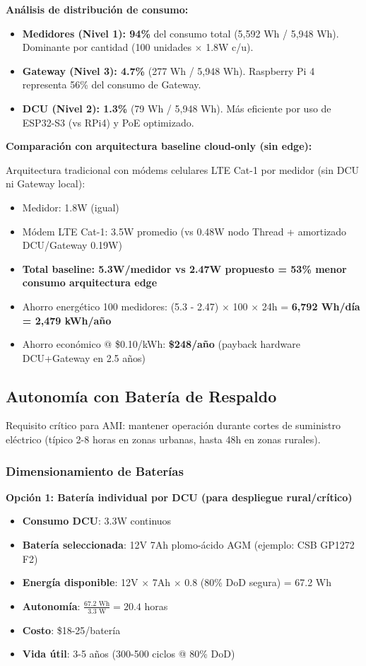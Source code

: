 \textbf{Análisis de distribución de consumo:}

\begin{itemize}
    \item \textbf{Medidores (Nivel 1): 94\%} del consumo total (5,592 Wh / 5,948 Wh). Dominante por cantidad (100 unidades $\times$ 1.8W c/u).
    \item \textbf{Gateway (Nivel 3): 4.7\%} (277 Wh / 5,948 Wh). Raspberry Pi 4 representa 56\% del consumo de Gateway.
    \item \textbf{DCU (Nivel 2): 1.3\%} (79 Wh / 5,948 Wh). Más eficiente por uso de ESP32-S3 (vs RPi4) y PoE optimizado.
\end{itemize}

\textbf{Comparación con arquitectura baseline cloud-only (sin edge):}

Arquitectura tradicional con módems celulares LTE Cat-1 por medidor (sin DCU ni Gateway local):
\begin{itemize}
    \item Medidor: 1.8W (igual)
    \item Módem LTE Cat-1: 3.5W promedio (vs 0.48W nodo Thread + amortizado DCU/Gateway 0.19W)
    \item \textbf{Total baseline: 5.3W/medidor vs 2.47W propuesto = 53\% menor consumo arquitectura edge}
    \item Ahorro energético 100 medidores: (5.3 - 2.47) $\times$ 100 $\times$ 24h = \textbf{6,792 Wh/día = 2,479 kWh/año}
    \item Ahorro económico @ \$0.10/kWh: \textbf{\$248/año} (payback hardware DCU+Gateway en 2.5 años)
\end{itemize}

\subsection{Autonomía con Batería de Respaldo}

Requisito crítico para AMI: mantener operación durante cortes de suministro eléctrico (típico 2-8 horas en zonas urbanas, hasta 48h en zonas rurales).

\subsubsection{Dimensionamiento de Baterías}

\textbf{Opción 1: Batería individual por DCU (para despliegue rural/crítico)}

\begin{itemize}
    \item \textbf{Consumo DCU}: 3.3W continuos
    \item \textbf{Batería seleccionada}: 12V 7Ah plomo-ácido AGM (ejemplo: CSB GP1272 F2)
    \item \textbf{Energía disponible}: 12V $\times$ 7Ah $\times$ 0.8 (80\% DoD segura) = 67.2 Wh
    \item \textbf{Autonomía}: $\frac{67.2 \text{ Wh}}{3.3 \text{ W}} = 20.4$ horas
    \item \textbf{Costo}: \$18-25/batería
    \item \textbf{Vida útil}: 3-5 años (300-500 ciclos @ 80\% DoD)
\end{itemize}

